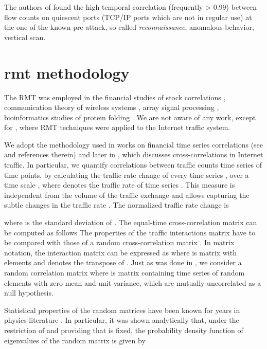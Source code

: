\documentclass{IEEEtran}
\begin{document}
The authors of \cite{McNutt} found the high temporal correlation
(frequently > 0.99) between flow counts on quiescent ports (TCP/IP
ports which are not in regular use) at the one of the known pre-attack,
so called \emph{reconnaissance}, anomalous behavior, vertical scan.


\section{rmt methodology}

The RMT was employed in the financial studies of stock correlations
\cite{Sharifi,Guhr1}, communication theory of wireless systems \cite{Tulino},
array signal processing \cite{Tse}, bioinformatics studies of protein
folding \cite{Zee}. We are not aware of any work, except for \cite{Barthelemy},
where RMT techniques were applied to the Internet traffic system. 

We adopt the methodology used in works on financial time series correlations
(see \cite{Sharifi,Guhr1} and references therein) and later in \cite{Barthelemy},
which discusses cross-correlations in Internet traffic. In particular,
we quantify correlations between  traffic counts time series of
 time points, by calculating the traffic rate change of every
time series   , over a time scale ,
where  denotes the traffic rate of time series
. This measure is independent from the volume of the traffic exchange
and allows capturing the subtle changes in the traffic rate \cite{Barthelemy}.
The normalized traffic rate change is


where 
is the standard deviation of . The equal-time cross-correlation
matrix  can be computed as follows
The properties of the traffic interactions matrix  have to be
compared with those of a random cross-correlation matrix \cite{Laloux}.
In matrix notation, the interaction matrix  can be expressed as
where  is  matrix with elements 
  and  denotes
the transpose of . Just as was done in \cite{Guhr1}, we consider
a random correlation matrix 
where  is  matrix containing  time series of 
random elements  with zero mean and unit variance, which
are mutually uncorrelated as a null hypothesis.

Statistical properties of the random matrices  have been known
for years in physics literature \cite{Wigner1,Brody,Dyson1,Dyson2,Mehta,Guhr3}.
In particular, it was shown analytically \cite{Sengupta} that, under
the restriction of   and
providing that  is fixed, the probability
density function  of eigenvalues 
of the random matrix  is given by
\end{document}
